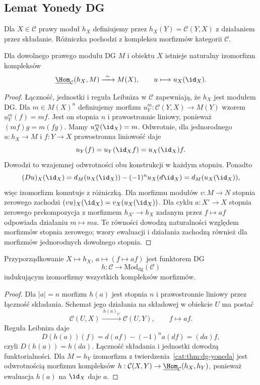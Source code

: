 \subsection{Lemat Yonedy DG}

\begin{definicja}\label{cat:def:dg-representable}
Dla $X\in\mathcal C$ prawy moduł $h_X$ definiujemy przez $h_X(Y)=\mathcal C(Y,X)$ z działaniem przez składanie. Różniczka pochodzi z kompleksu morfizmów kategorii $\mathcal C$.
\end{definicja}

\begin{twierdzenie}\label{cat:thm:dg-yoneda}
Dla dowolnego prawego modułu DG $M$ i obiektu $X$ istnieje naturalny izomorfizm kompleksów
\[
 \underline{\Hom}_{\mathcal C}(h_X,M)\xrightarrow{\ \sim\ } M(X),
 \qquad u\longmapsto u_X(\id_X).
\]
\end{twierdzenie}
\begin{proof}
Łączność, jednostki i reguła Leibniza w $\mathcal C$ zapewniają, że $h_X$ jest modułem DG. Dla $m\in M(X)^n$ definiujemy morfizm $u^m_Y:\mathcal C(Y,X)\to M(Y)$ wzorem $u^m_Y(f)=mf$. Jest on stopnia $n$ i prawostronnie liniowy, ponieważ $(mf)g=m(fg)$. Mamy $u^m_X(\id_X)=m$. Odwrotnie, dla jednorodnego $u:h_X\to M$ i $f:Y\to X$ prawostronna liniowość daje
\[
 u_Y(f)=u_Y(\id_X f)=u_X(\id_X)f.
\]
Dowodzi to wzajemnej odwrotności obu konstrukcji w każdym stopniu. Ponadto
\[
 (Du)_X(\id_X)=d_M(u_X(\id_X))-(-1)^n u_X(d\id_X)
 =d_M(u_X(\id_X)),
\]
więc izomorfizm komutuje z różniczką. Dla morfizmu modułów $v:M\to N$ stopnia zerowego zachodzi $(vu)_X(\id_X)=v_X(u_X(\id_X))$. Dla cyklu $a:X'\to X$ stopnia zerowego prekompozycja z morfizmem $h_{X'}\to h_X$ zadanym przez $f\mapsto af$ odpowiada działaniu $m\mapsto ma$. Te równości dowodzą naturalności względem morfizmów stopnia zerowego; wzory ewaluacji i działania zachodzą również dla morfizmów jednorodnych dowolnego stopnia.
\end{proof}

\begin{wniosek}\label{cat:cor:dg-yoneda-embedding}
Przyporządkowanie $X\mapsto h_X$, $a\mapsto (f\mapsto af)$ jest funktorem DG
\[
 h:\mathcal C\longrightarrow\mathrm{Mod}_{\mathrm{dg}}(\mathcal C)
\]
indukującym izomorfizmy wszystkich kompleksów morfizmów.
\end{wniosek}
\begin{proof}
Dla $|a|=n$ morfizm $h(a)$ jest stopnia $n$ i prawostronnie liniowy przez łączność składania. Schemat jego działania na składowej w obiekcie $U$ ma postać
\[
 \mathcal C(U,X)\xrightarrow{\ h(a)_U\ }\mathcal C(U,Y),
 \qquad f\longmapsto af.
\] Reguła Leibniza daje
\[
 D(h(a))(f)=d(af)-(-1)^na(df)=(da)f,
\]
czyli $D(h(a))=h(da)$. Łączność składania i jednostki dowodzą funktorialności. Dla $M=h_Y$ izomorfizm z twierdzenia~\ref{cat:thm:dg-yoneda} jest odwrotnością morfizmu kompleksów $h:\mathcal C(X,Y)\to\underline{\Hom}_{\mathcal C}(h_X,h_Y)$, ponieważ ewaluacja $h(a)$ na $\id_X$ daje $a$.
\end{proof}

